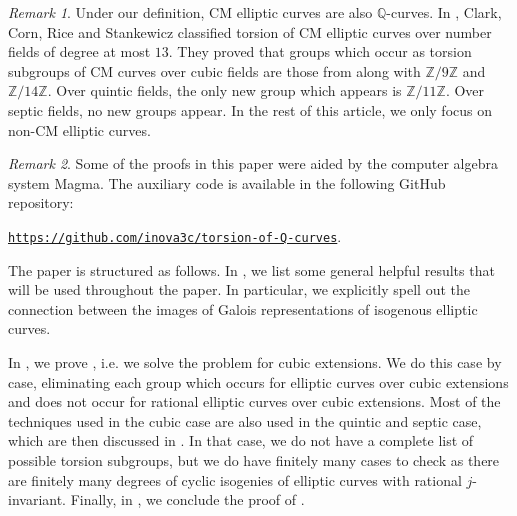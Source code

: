 \documentclass[10pt,leqno]{amsart}
\newcommand{\Z}{\mathbb{Z}}
\newcommand{\Q}{\mathbb{Q}}
\newtheorem{theorem}{Theorem}[]
\theoremstyle{definition}
\theoremstyle{remark}
\newtheorem{remark}[theorem]{Remark}
\numberwithin{theorem}{section}
\begin{document}



\begin{remark}  Under our definition, CM elliptic curves are also $\Q$-curves. In \cite{CMcase},  Clark, Corn, Rice and Stankewicz classified torsion of CM elliptic curves over number fields of degree at most $13$. They proved that groups which occur as torsion subgroups of CM curves over cubic fields are those from  along with $\Z/9\Z$ and $\Z/14\Z$. Over quintic fields, the only new group which appears is $\Z/11\Z$. Over septic fields, no new groups appear. In the rest of this article, we only focus on non-CM elliptic curves.
\end{remark}



\begin{remark}
    Some of the proofs in this paper were aided by the computer algebra system Magma. The auxiliary code is available in the following GitHub repository:
    \begin{center}
        \hyperlink{https://github.com/inova3c/torsion-of-Q-curves}{\texttt{https://github.com/inova3c/torsion-of-Q-curves}}.
    \end{center}


\end{remark}

The paper is structured as follows. In , we list some general helpful results that will be used throughout the paper. In particular, we explicitly spell out the connection between the images of Galois representations of isogenous elliptic curves.

In , we prove , i.e. we solve the problem for cubic extensions. We do this case by case, eliminating each group which occurs for elliptic curves over cubic extensions and does not occur for rational elliptic curves over cubic extensions. Most of the techniques used in the cubic case are also used in the quintic and septic case, which are then discussed in . In that case, we do not have a complete list of possible torsion subgroups, but we do have finitely many cases to check as there are finitely many degrees of cyclic isogenies of elliptic curves with rational $j$-invariant. Finally, in , we conclude the proof of . 
\end{document}
